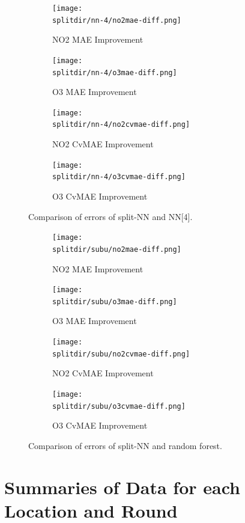 \documentclass[journal abbreviation, manuscript]{copernicus}
\begin{document}
\begin{figure}[H]
\begin{subfigure}{0.49\textwidth}
\texttt{[image: \\splitdir/nn-4/no2mae-diff.png]}
\caption{NO2 MAE Improvement}
\end{subfigure}
\begin{subfigure}{0.49\textwidth}
\texttt{[image: \\splitdir/nn-4/o3mae-diff.png]}
\caption{O3 MAE Improvement}
\end{subfigure}
\begin{subfigure}{0.49\textwidth}
\texttt{[image: \\splitdir/nn-4/no2cvmae-diff.png]}
\caption{NO2 CvMAE Improvement}
\end{subfigure}
\begin{subfigure}{0.49\textwidth}
\texttt{[image: \\splitdir/nn-4/o3cvmae-diff.png]}
\caption{O3 CvMAE Improvement}
\end{subfigure}
\caption{Comparison of errors of split-NN and NN[4].}
\end{figure}

\begin{figure}[H]
\begin{subfigure}{0.49\textwidth}
\texttt{[image: \\splitdir/subu/no2mae-diff.png]}
\caption{NO2 MAE Improvement}
\end{subfigure}
\begin{subfigure}{0.49\textwidth}
\texttt{[image: \\splitdir/subu/o3mae-diff.png]}
\caption{O3 MAE Improvement}
\end{subfigure}
\begin{subfigure}{0.49\textwidth}
\texttt{[image: \\splitdir/subu/no2cvmae-diff.png]}
\caption{NO2 CvMAE Improvement}
\end{subfigure}
\begin{subfigure}{0.49\textwidth}
\texttt{[image: \\splitdir/subu/o3cvmae-diff.png]}
\caption{O3 CvMAE Improvement}
\end{subfigure}
\caption{Comparison of errors of split-NN and random forest.}
\end{figure}

\fi

\renewcommand{\thetable}{\Alph{section}.\arabic{table}}

\section{Summaries of Data for each Location and Round}
\label{sec:summaryresults}
\end{document}
